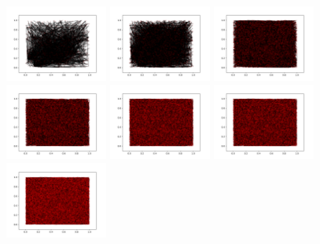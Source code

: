 \documentclass{article}
\begin{document}
\begin{figure}[h!]
    \centering
    \includegraphics[width=0.3\textwidth]{NormalImgurGraph5.png}
    \includegraphics[width=0.3\textwidth]{NormalImgurGraph10.png}
    \includegraphics[width=0.3\textwidth]{NormalImgurGraph15.png}
    \includegraphics[width=0.3\textwidth]{NormalImgurGraph20.png}
    \includegraphics[width=0.3\textwidth]{NormalImgurGraph25.png}
    \includegraphics[width=0.3\textwidth]{NormalImgurGraph30.png}
    \includegraphics[width=0.3\textwidth]{NormalImgurGraph35.png}

\end{figure}
\end{document}
